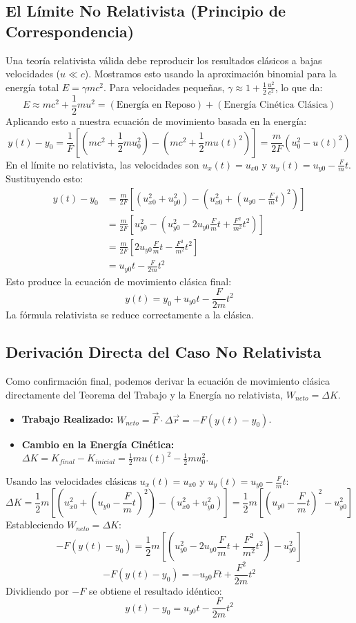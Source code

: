 \documentclass[11pt,a4paper]{article}
\begin{document}
\subsection{El Límite No Relativista (Principio de Correspondencia)}
Una teoría relativista válida debe reproducir los resultados clásicos a bajas velocidades ($u \ll c$). Mostramos esto usando la aproximación binomial para la energía total $E = \gamma mc^2$. Para velocidades pequeñas, $\gamma \approx 1 + \frac{1}{2}\frac{u^2}{c^2}$, lo que da:
\[ E \approx mc^2 + \frac{1}{2}mu^2 = (\text{Energía en Reposo}) + (\text{Energía Cinética Clásica}) \]
Aplicando esto a nuestra ecuación de movimiento basada en la energía:
\[ y(t) - y_0 = \frac{1}{F} \left[ \left(mc^2 + \frac{1}{2}mu_0^2\right) - \left(mc^2 + \frac{1}{2}mu(t)^2\right) \right] = \frac{m}{2F}(u_0^2 - u(t)^2) \]
En el límite no relativista, las velocidades son $u_x(t) = u_{x0}$ y $u_y(t) = u_{y0} - \frac{F}{m}t$. Sustituyendo esto:
\begin{align*}
y(t) - y_0 &= \frac{m}{2F} \left[ (u_{x0}^2 + u_{y0}^2) - \left(u_{x0}^2 + (u_{y0} - \frac{F}{m}t)^2\right) \right] \\
&= \frac{m}{2F} \left[ u_{y0}^2 - \left(u_{y0}^2 - 2u_{y0}\frac{F}{m}t + \frac{F^2}{m^2}t^2\right) \right] \\
&= \frac{m}{2F} \left[ 2u_{y0}\frac{F}{m}t - \frac{F^2}{m^2}t^2 \right] \\
&= u_{y0}t - \frac{F}{2m}t^2
\end{align*}
Esto produce la ecuación de movimiento clásica final:
\[ \boxed{y(t) = y_0 + u_{y0}t - \frac{F}{2m}t^2} \]
La fórmula relativista se reduce correctamente a la clásica.

\subsection{Derivación Directa del Caso No Relativista}
Como confirmación final, podemos derivar la ecuación de movimiento clásica directamente del Teorema del Trabajo y la Energía no relativista, $W_{neto} = \Delta K$.
\begin{itemize}
    \item \textbf{Trabajo Realizado:} $W_{neto} = \vec{F} \cdot \Delta\vec{r} = -F(y(t) - y_0)$.
    \item \textbf{Cambio en la Energía Cinética:} $\Delta K = K_{final} - K_{inicial} = \frac{1}{2}mu(t)^2 - \frac{1}{2}mu_0^2$.
\end{itemize}
Usando las velocidades clásicas $u_x(t) = u_{x0}$ y $u_y(t) = u_{y0} - \frac{F}{m}t$:
\[ \Delta K = \frac{1}{2}m\left[ (u_{x0}^2 + (u_{y0}-\frac{F}{m}t)^2) - (u_{x0}^2+u_{y0}^2) \right] = \frac{1}{2}m\left[ (u_{y0}-\frac{F}{m}t)^2 - u_{y0}^2 \right] \]
Estableciendo $W_{neto} = \Delta K$:
\[ -F(y(t)-y_0) = \frac{1}{2}m\left[ (u_{y0}^2 - 2u_{y0}\frac{F}{m}t + \frac{F^2}{m^2}t^2) - u_{y0}^2 \right] \]
\[ -F(y(t)-y_0) = -u_{y0}Ft + \frac{F^2}{2m}t^2 \]
Dividiendo por $-F$ se obtiene el resultado idéntico:
\[ y(t) - y_0 = u_{y0}t - \frac{F}{2m}t^2 \]
\end{document}
